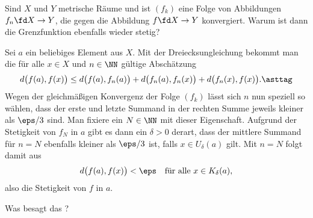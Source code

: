 \begin{frage}
  Sind $X$ und $Y$ metrische Räume und ist $(f_k)$ eine Folge 
  von  Abbildungen $f_n \fd X\to Y$, 
  die  gegen die Abbildung $f \fd X\to Y$ 
  konvergiert. Warum ist dann die Grenzfunktion ebenfalls wieder stetig?
\end{frage}

\begin{antwort}
  Sei $a$ ein beliebiges Element aus $X$. 
  Mit der Dreiecksungleichung bekommt man 
  die für alle $x \in X$ und $n \in \NN$ 
  gültige Abschätzung 
  \begin{equation}
    d \big( f(a), f(x) \big)\le
    d \big( f(a), f_n(a) \big) + 
    d \big( f_n(a), f_n(x) \big) + 
    d \big( f_n(x), f(x) \big).
    \asttag  
  \end{equation}
  Wegen der gleichmäßigen Konvergenz der Folge $(f_k)$ lässt sich 
  $n$ nun speziell so wählen, dass der erste und letzte Summand in der 
  rechten Summe jeweils kleiner als $\eps/3$ sind. Man fixiere 
  ein $N\in\NN$ mit dieser Eigenschaft. Aufgrund der Stetigkeit 
  von $f_N$ in $a$ gibt es dann ein $\delta>0$ derart, 
  dass der mittlere Summand für $n=N$ ebenfalls kleiner als $\eps/3$ ist, 
  falls $x\in U_\delta( a )$ gilt. 
  Mit $n=N$ folgt damit aus {\astref} 
  \[
  d \big( f(a), f(x) \big) < \eps \quad \text{für alle $x\in K_\delta(a)$},
  \]
  also die Stetigkeit von $f$ in $a$. 
  \AntEnd
\end{antwort}

\begin{frage}\heavy{}
  Was besagt das ?
\end{frage}


